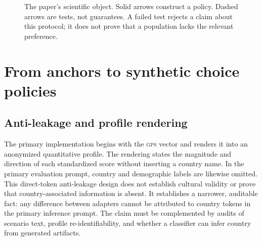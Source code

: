\documentclass[10pt,letterpaper]{article}
\newcommand{\Pcal}{\mathcal{P}}
\newcommand{\GPS}{\textsc{gps}}
\begin{document}
\begin{figure}[H]
\centering
{}
\caption{The paper's scientific object. Solid arrows construct a policy. Dashed arrows are tests, not guarantees. A failed test rejects a claim about this protocol; it does not prove that a population lacks the relevant preference.}\label{fig:object}
\end{figure}

\section{From anchors to synthetic choice policies}
\subsection{Anti-leakage and profile rendering}
The primary implementation begins with the \GPS{} vector and renders it into an anonymized quantitative profile. The rendering states the magnitude and direction of each standardized score without inserting a country name. In the primary evaluation prompt, country and demographic labels are likewise omitted. This direct-token anti-leakage design does not establish cultural validity or prove that country-associated information is absent. It establishes a narrower, auditable fact: any difference between adapters cannot be attributed to country tokens in the primary inference prompt. The claim must be complemented by audits of scenario text, profile re-identifiability, and whether a classifier can infer country from generated artifacts.
\end{document}
